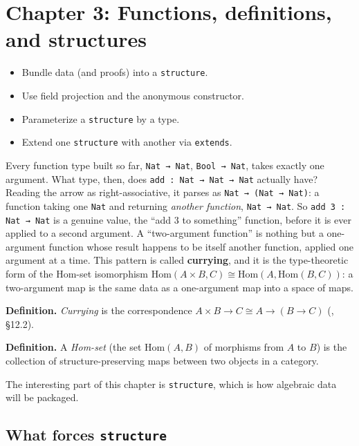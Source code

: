 \chapter{Chapter 3: Functions, definitions, and structures}\label{sec:03-functions-and-structures:00-index:1}

\begin{learningobjectives}
\begin{itemize}
\tightlist
\item
  Bundle data (and proofs) into a \texttt{structure}.
\item
  Use field projection and the anonymous constructor.
\item
  Parameterize a \texttt{structure} by a type.
\item
  Extend one \texttt{structure} with another via \texttt{extends}.
\end{itemize}
\end{learningobjectives}


Every function type built so far, \texttt{Nat → Nat}, \texttt{Bool → Nat}, takes exactly one argument. What type, then, does \texttt{add : Nat → Nat → Nat} actually have? Reading the arrow as right-associative, it parses as \texttt{Nat → (Nat → Nat)}: a function taking one \texttt{Nat} and returning \emph{another function}, \texttt{Nat → Nat}. So \texttt{add 3 : Nat → Nat} is a genuine value, the ``add 3 to something'' function, before it is ever applied to a second argument. A ``two-argument function'' is nothing but a one-argument function whose result happens to be itself another function, applied one argument at a time. This pattern is called \textbf{currying}, and it is the type-theoretic form of the Hom-set isomorphism \(\mathrm{Hom}(A\times B, C)\cong\mathrm{Hom}(A,\mathrm{Hom}(B,C))\): a two-argument map is the same data as a one-argument map into a space of maps.

\textbf{Definition.} \emph{Currying} is the correspondence \(A \times B \to C \cong A \to (B \to C)\) (\cite{Pierce2002}, §12.2).

\textbf{Definition.} A \emph{Hom-set} (the set \(\mathrm{Hom}(A,B)\) of morphisms from \(A\) to \(B\)) is the collection of structure-preserving maps between two objects in a category.

The interesting part of this chapter is \texttt{structure}, which is how algebraic data will be packaged.

\section*{\texorpdfstring{What forces \texttt{structure}}{What forces structure}}\label{sec:03-functions-and-structures:00-index:2}


